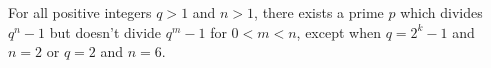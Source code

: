 \documentclass[12pt]{article}
\begin{document}
For all positive integers $q>1$ and $n>1$, there exists a prime $p$ which divides $q^n-1$ but doesn't divide $q^m-1$ for $0<m<n$, except when $q=2^k-1$ and $n=2$ or $q=2$ and $n=6$.
\end{document}
